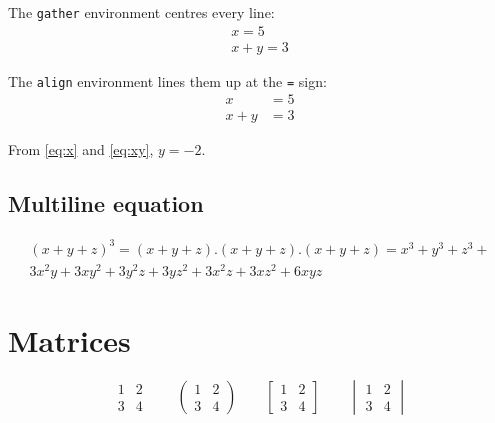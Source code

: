 \documentclass[11pt,a4paper]{article}
\begin{document}
The \texttt{gather} environment centres every line:
\begin{gather}
    x = 5 \label{eq:x}\\
    x + y = 3 \label{eq:xy}
\end{gather}

The \texttt{align} environment lines them up at the \texttt{=} sign:
\begin{align}
    x     &= 5 \\
    x + y &= 3
\end{align}

From \eqref{eq:x} and \eqref{eq:xy}, $y = -2$.

\subsection{Multiline equation}

\begin{multline*}
    (x + y + z)^3 = (x + y + z).(x + y + z).(x + y + z)
        = x^3 + y^3 + z^3 + {} \\
        3x^2y + 3xy^2 + 3y^2z + 3yz^2 + 3x^2z + 3xz^2 + 6xyz
\end{multline*}

\section{Matrices}

\[
    \begin{matrix} 1 & 2 \\ 3 & 4 \end{matrix}
    \qquad
    \begin{pmatrix} 1 & 2 \\ 3 & 4 \end{pmatrix}
    \qquad
    \begin{bmatrix} 1 & 2 \\ 3 & 4 \end{bmatrix}
    \qquad
    \begin{vmatrix} 1 & 2 \\ 3 & 4 \end{vmatrix}
\]
\end{document}
